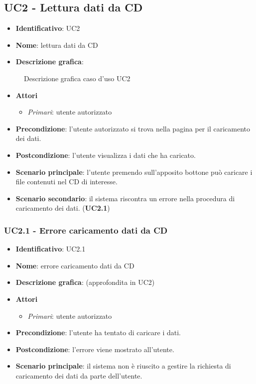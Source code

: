 
\subsection{UC2 - Lettura dati da CD}
\begin{itemize}
  \item \textbf{Identificativo}: UC2
  \item \textbf{Nome}: lettura dati da CD
  \item \textbf{Descrizione grafica}:
\end{itemize}

\begin{figure}[h]
  \centering
  \caption{Descrizione grafica caso d'uso UC2}
\end{figure}

\begin{itemize}
  \item \textbf{Attori}
        \begin{itemize}
          \item \textit{Primari}: utente autorizzato
        \end{itemize}
  \item \textbf{Precondizione}: l'utente autorizzato si trova nella pagina per il caricamento dei dati.
  \item \textbf{Postcondizione}: l'utente visualizza i dati che ha caricato.
  \item \textbf{Scenario principale}: l'utente premendo sull'apposito bottone può caricare i file contenuti nel CD di interesse.
  \item \textbf{Scenario secondario}: il sistema riscontra un errore nella procedura di caricamento dei dati. (\textbf{UC2.1})
\end{itemize}

\subsubsection{UC2.1 - Errore caricamento dati da CD}
\begin{itemize}
  \item \textbf{Identificativo}: UC2.1
  \item \textbf{Nome}: errore caricamento dati da CD
  \item \textbf{Descrizione grafica}: (approfondita in UC2)
  \item \textbf{Attori}
        \begin{itemize}
          \item \textit{Primari}: utente autorizzato
        \end{itemize}
  \item \textbf{Precondizione}: l'utente ha tentato di caricare i dati.
  \item \textbf{Postcondizione}: l'errore viene mostrato all'utente.
  \item \textbf{Scenario principale}: il sistema non è riuscito a gestire la richiesta di caricamento dei dati da parte dell'utente.
\end{itemize}